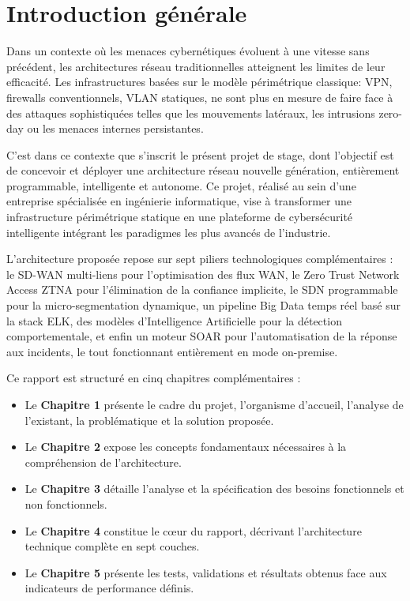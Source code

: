 \documentclass[12pt,a4paper,oneside]{report}
\begin{document}
\cleardoublepage

\cleardoublepage
{}
\setcounter{page}{1}
\chapter*{Introduction générale}
	
	Dans un contexte où les menaces cybernétiques évoluent à une vitesse sans précédent, les architectures réseau traditionnelles atteignent les limites de leur efficacité. Les infrastructures basées sur le modèle périmétrique classique: VPN, firewalls conventionnels, VLAN statiques, ne sont plus en mesure de faire face à des attaques sophistiquées telles que les mouvements latéraux, les intrusions zero-day ou les menaces internes persistantes.
	
	C'est dans ce contexte que s'inscrit le présent projet de stage, dont l'objectif est de concevoir et déployer une architecture réseau nouvelle génération, entièrement programmable, intelligente et autonome. Ce projet, réalisé au sein d'une entreprise spécialisée en ingénierie informatique, vise à transformer une infrastructure périmétrique statique en une plateforme de cybersécurité intelligente intégrant les paradigmes les plus avancés de l'industrie.
	
	L'architecture proposée repose sur sept piliers technologiques complémentaires : le SD-WAN multi-liens pour l'optimisation des flux WAN, le Zero Trust Network Access ZTNA pour l'élimination de la confiance implicite, le SDN programmable pour la micro-segmentation dynamique, un pipeline Big Data temps réel basé sur la stack ELK, des modèles d'Intelligence Artificielle pour la détection comportementale, et enfin un moteur SOAR pour l'automatisation de la réponse aux incidents, le tout fonctionnant entièrement en mode on-premise.
	
	Ce rapport est structuré en cinq chapitres complémentaires :
	
	\begin{itemize}
		\item Le \textbf{Chapitre 1} présente le cadre du projet, l'organisme d'accueil, l'analyse de l'existant, la problématique et la solution proposée.
		
		\item Le \textbf{Chapitre 2} expose les concepts fondamentaux nécessaires à la compréhension de l'architecture.
		
		\item Le \textbf{Chapitre 3} détaille l'analyse et la spécification des besoins fonctionnels et non fonctionnels.
		
		\item Le \textbf{Chapitre 4} constitue le cœur du rapport, décrivant l'architecture technique complète en sept couches.
		
		\item Le \textbf{Chapitre 5} présente les tests, validations et résultats obtenus face aux indicateurs de performance définis.
	\end{itemize}
\end{document}

